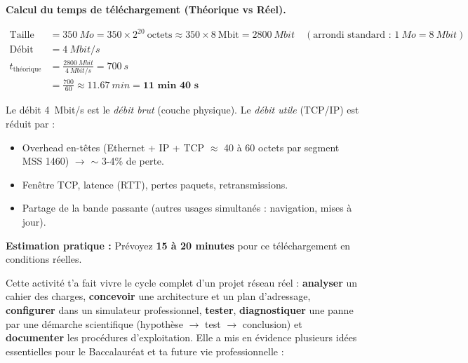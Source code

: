 \documentclass[11pt]{article}
\newcounter{popsec}
\newcounter{popsub}
\newcommand{\courssub}[1]{%
  \stepcounter{popsub}%
  \par\vspace{9pt}\noindent{\popxbold\fontsize{11.5}{13}\selectfont\color{popink}{\color{poporange}\thepopsec.\thepopsub}\hspace{6pt}#1}\par\nopagebreak\vspace{4pt}
}
\begin{document}
\begin{exoresolu}
\textbf{Calcul du temps de téléchargement (Théorique vs Réel).}

\begin{align*}
\text{Taille fichier} &= \SI{350}{Mo} = 350 \times 2^{20}~\text{octets} \approx 350 \times 8~\text{Mbit} = \SI{2800}{Mbit} \quad (\text{arrondi standard : } 1~Mo = 8~Mbit) \\
\text{Débit liaison} &= \SI{4}{Mbit/s} \\
t_{\text{théorique}} &= \frac{\SI{2800}{Mbit}}{\SI{4}{Mbit/s}} = \SI{700}{s} \\
&= \frac{700}{60} \approx \SI{11.67}{min} = \textbf{11 min 40 s}
\end{align*}

\begin{attention}
Le débit \SI{4}{Mbit/s} est le \emph{débit brut} (couche physique). Le \emph{débit utile} (TCP/IP) est réduit par :
\begin{itemize}
\item Overhead en-têtes (Ethernet + IP + TCP $\approx$ 40 à 60 octets par segment MSS 1460) $\rightarrow$ $\sim$ 3-4\% de perte.
\item Fenêtre TCP, latence (RTT), pertes paquets, retransmissions.
\item Partage de la bande passante (autres usages simultanés : navigation, mises à jour).
\end{itemize}
\textbf{Estimation pratique :} Prévoyez \textbf{15 à 20 minutes} pour ce téléchargement en conditions réelles.
\end{attention}

\end{exoresolu}

\courssub{Bilan de l'activité}

Cette activité t'a fait vivre le cycle complet d'un projet réseau réel : \textbf{analyser} un cahier des charges, \textbf{concevoir} une architecture et un plan d'adressage, \textbf{configurer} dans un simulateur professionnel, \textbf{tester}, \textbf{diagnostiquer} une panne par une démarche scientifique (hypothèse $\rightarrow$ test $\rightarrow$ conclusion) et \textbf{documenter} les procédures d'exploitation. Elle a mis en évidence plusieurs idées essentielles pour le Baccalauréat et ta future vie professionnelle :
\end{document}
